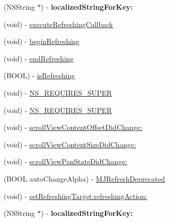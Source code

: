 \begin{DoxyCompactItemize}
\item 
\mbox{\label{interface_m_j_refresh_component_affa666b6aa57b1c781a55ba2069cf319}} 
(N\+S\+String $\ast$) -\/ {\bfseries localized\+String\+For\+Key\+:}
\item 
(void) -\/ \mbox{\hyperlink{interface_m_j_refresh_component_a618a54cc5f6bad921ebcbfdc637fb892}{execute\+Refreshing\+Callback}}
\item 
(void) -\/ \mbox{\hyperlink{interface_m_j_refresh_component_a0f34a467638a93530b64ae1237785b0a}{begin\+Refreshing}}
\item 
(void) -\/ \mbox{\hyperlink{interface_m_j_refresh_component_a609c032e2e29754a553b78b544b40223}{end\+Refreshing}}
\item 
(B\+O\+OL) -\/ \mbox{\hyperlink{interface_m_j_refresh_component_abe507257c3d1ff768ff51ce37265fba3}{is\+Refreshing}}
\item 
(void) -\/ \mbox{\hyperlink{interface_m_j_refresh_component_a3c89effddae59a40b856391db8985aba}{N\+S\+\_\+\+R\+E\+Q\+U\+I\+R\+E\+S\+\_\+\+S\+U\+P\+ER}}
\item 
(void) -\/ \mbox{\hyperlink{interface_m_j_refresh_component_a3c89effddae59a40b856391db8985aba}{N\+S\+\_\+\+R\+E\+Q\+U\+I\+R\+E\+S\+\_\+\+S\+U\+P\+ER}}
\item 
(void) -\/ \mbox{\hyperlink{interface_m_j_refresh_component_a9ca510683802fd76db4ab79ad31cd6b9}{scroll\+View\+Content\+Offset\+Did\+Change\+:}}
\item 
(void) -\/ \mbox{\hyperlink{interface_m_j_refresh_component_af32e7cdaf4d1503b551e77baa8266aa5}{scroll\+View\+Content\+Size\+Did\+Change\+:}}
\item 
(void) -\/ \mbox{\hyperlink{interface_m_j_refresh_component_a16e5ed763451362a1bc76caa4ed761b1}{scroll\+View\+Pan\+State\+Did\+Change\+:}}
\item 
(B\+O\+OL auto\+Change\+Alpha) -\/ \mbox{\hyperlink{interface_m_j_refresh_component_afa4faed890bbcd4a6926c69c6d443196}{M\+J\+Refresh\+Deprecated}}
\item 
(void) -\/ \mbox{\hyperlink{interface_m_j_refresh_component_a9af3d33329e4ed8f7aed41eed601be99}{set\+Refreshing\+Target\+:refreshing\+Action\+:}}
\item 
\mbox{\label{interface_m_j_refresh_component_affa666b6aa57b1c781a55ba2069cf319}} 
(N\+S\+String $\ast$) -\/ {\bfseries localized\+String\+For\+Key\+:}
\item 

\end{DoxyCompactItemize}
